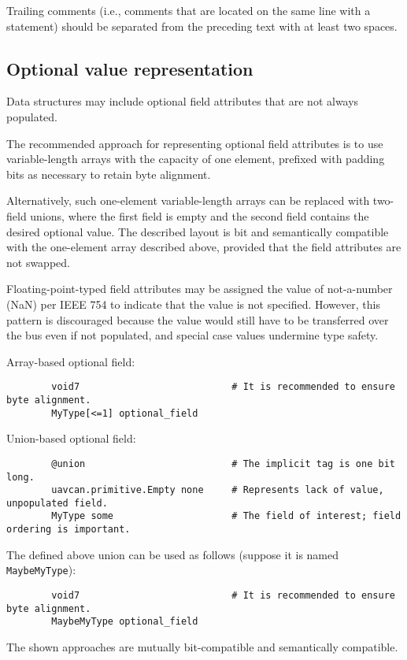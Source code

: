 Trailing comments (i.e., comments that are located on the same line with a statement)
should be separated from the preceding text with at least two spaces.


\subsection{Optional value representation}

Data structures may include optional field attributes that are not always populated.

The recommended approach for representing optional field attributes
is to use variable-length arrays with the capacity of one element,
prefixed with padding bits as necessary to retain byte alignment.

Alternatively, such one-element variable-length arrays can be replaced with two-field unions,
where the first field is empty and the second field contains the desired optional value.
The described layout is bit and semantically compatible with the one-element array described above,
provided that the field attributes are not swapped.

Floating-point-typed field attributes may be assigned the value of not-a-number (NaN) per IEEE 754
to indicate that the value is not specified.
However, this pattern is discouraged because the value would still have to be transferred over the bus
even if not populated, and special case values undermine type safety.

\begin{remark}[breakable]
    Array-based optional field:

    \begin{verbatim}
        void7                           # It is recommended to ensure byte alignment.
        MyType[<=1] optional_field
    \end{verbatim}

    Union-based optional field:

    \begin{verbatim}
        @union                          # The implicit tag is one bit long.
        uavcan.primitive.Empty none     # Represents lack of value, unpopulated field.
        MyType some                     # The field of interest; field ordering is important.
    \end{verbatim}

    The defined above union can be used as follows (suppose it is named \verb|MaybeMyType|):

    \begin{verbatim}
        void7                           # It is recommended to ensure byte alignment.
        MaybeMyType optional_field
    \end{verbatim}

    The shown approaches are mutually bit-compatible and semantically compatible.
\end{remark}

